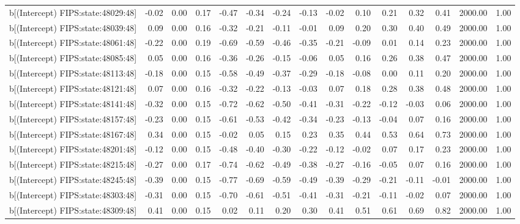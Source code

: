 \begin{table}[ht]
\begin{tabular}{rrrrrrrrrrrrrrr}
  b[(Intercept) FIPS:state:48029:48] & -0.02 & 0.00 & 0.17 & -0.47 & -0.34 & -0.24 & -0.13 & -0.02 & 0.10 & 0.21 & 0.32 & 0.41 & 2000.00 & 1.00 \\ 
  b[(Intercept) FIPS:state:48039:48] & 0.09 & 0.00 & 0.16 & -0.32 & -0.21 & -0.11 & -0.01 & 0.09 & 0.20 & 0.30 & 0.40 & 0.49 & 2000.00 & 1.00 \\ 
  b[(Intercept) FIPS:state:48061:48] & -0.22 & 0.00 & 0.19 & -0.69 & -0.59 & -0.46 & -0.35 & -0.21 & -0.09 & 0.01 & 0.14 & 0.23 & 2000.00 & 1.00 \\ 
  b[(Intercept) FIPS:state:48085:48] & 0.05 & 0.00 & 0.16 & -0.36 & -0.26 & -0.15 & -0.06 & 0.05 & 0.16 & 0.26 & 0.38 & 0.47 & 2000.00 & 1.00 \\ 
  b[(Intercept) FIPS:state:48113:48] & -0.18 & 0.00 & 0.15 & -0.58 & -0.49 & -0.37 & -0.29 & -0.18 & -0.08 & 0.00 & 0.11 & 0.20 & 2000.00 & 1.00 \\ 
  b[(Intercept) FIPS:state:48121:48] & 0.07 & 0.00 & 0.16 & -0.32 & -0.22 & -0.13 & -0.03 & 0.07 & 0.18 & 0.28 & 0.38 & 0.48 & 2000.00 & 1.00 \\ 
  b[(Intercept) FIPS:state:48141:48] & -0.32 & 0.00 & 0.15 & -0.72 & -0.62 & -0.50 & -0.41 & -0.31 & -0.22 & -0.12 & -0.03 & 0.06 & 2000.00 & 1.00 \\ 
  b[(Intercept) FIPS:state:48157:48] & -0.23 & 0.00 & 0.15 & -0.61 & -0.53 & -0.42 & -0.34 & -0.23 & -0.13 & -0.04 & 0.07 & 0.16 & 2000.00 & 1.00 \\ 
  b[(Intercept) FIPS:state:48167:48] & 0.34 & 0.00 & 0.15 & -0.02 & 0.05 & 0.15 & 0.23 & 0.35 & 0.44 & 0.53 & 0.64 & 0.73 & 2000.00 & 1.00 \\ 
  b[(Intercept) FIPS:state:48201:48] & -0.12 & 0.00 & 0.15 & -0.48 & -0.40 & -0.30 & -0.22 & -0.12 & -0.02 & 0.07 & 0.17 & 0.23 & 2000.00 & 1.00 \\ 
  b[(Intercept) FIPS:state:48215:48] & -0.27 & 0.00 & 0.17 & -0.74 & -0.62 & -0.49 & -0.38 & -0.27 & -0.16 & -0.05 & 0.07 & 0.16 & 2000.00 & 1.00 \\ 
  b[(Intercept) FIPS:state:48245:48] & -0.39 & 0.00 & 0.15 & -0.77 & -0.69 & -0.59 & -0.49 & -0.39 & -0.29 & -0.21 & -0.11 & -0.01 & 2000.00 & 1.00 \\ 
  b[(Intercept) FIPS:state:48303:48] & -0.31 & 0.00 & 0.15 & -0.70 & -0.61 & -0.51 & -0.41 & -0.31 & -0.21 & -0.11 & -0.02 & 0.07 & 2000.00 & 1.00 \\ 
  b[(Intercept) FIPS:state:48309:48] & 0.41 & 0.00 & 0.15 & 0.02 & 0.11 & 0.20 & 0.30 & 0.41 & 0.51 & 0.61 & 0.69 & 0.82 & 2000.00 & 1.00 \\ 

\end{tabular}
\end{table}
